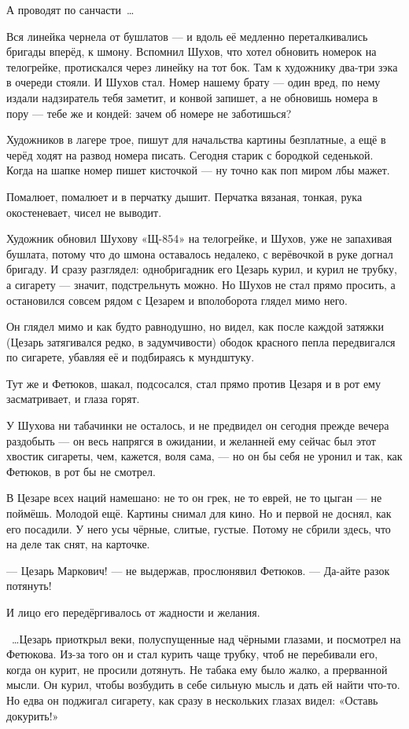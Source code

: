 А проводят по санчасти~\dots{}

Вся линейка чернела от бушлатов --- и вдоль её медленно переталкивались бригады вперёд, к 
шмону. Вспомнил Шухов, что хотел обновить номерок на телогрейке, протискался через линейку 
на тот бок. Там к художнику два-три зэка в очереди стояли. И Шухов стал. Номер нашему брату --- 
один вред, по нему издали надзиратель тебя заметит, и конвой запишет, а не обновишь номера в 
пору --- тебе же и кондей: зачем об номере не заботишься?

Художников в лагере трое, пишут для начальства картины безплатные, а ещё в черёд ходят на 
развод номера писать. Сегодня старик с бородкой седенькой. Когда на шапке номер пишет 
кисточкой --- ну точно как поп миром лбы мажет.

Помалюет, помалюет и в перчатку дышит. Перчатка вязаная, тонкая, рука окостеневает, чисел не 
выводит.

Художник обновил Шухову «Щ-854» на телогрейке, и Шухов, уже не запахивая бушлата, потому что до 
шмона оставалось недалеко, с верёвочкой в руке догнал бригаду. И сразу разглядел: 
однобригадник его Цезарь курил, и курил не трубку, а сигарету --- значит, подстрельнуть можно. 
Но Шухов не стал прямо просить, а остановился совсем рядом с Цезарем и вполоборота глядел 
мимо него.

Он глядел мимо и как будто равнодушно, но видел, как после каждой затяжки (Цезарь затягивался 
редко, в задумчивости) ободок красного пепла передвигался по сигарете, убавляя её и 
подбираясь к мундштуку.

Тут же и Фетюков, шакал, подсосался, стал прямо против Цезаря и в рот ему засматривает, и 
глаза горят.

У Шухова ни табачинки не осталось, и не предвидел он сегодня прежде вечера раздобыть --- он 
весь напрягся в ожидании, и желанней ему сейчас был этот хвостик сигареты, чем, кажется, воля 
сама, --- но он бы себя не уронил и так, как Фетюков, в рот бы не смотрел.

В Цезаре всех наций намешано: не то он грек, не то еврей, не то цыган --- не поймёшь. Молодой ещё. 
Картины снимал для кино. Но и первой не доснял, как его посадили. У него усы чёрные, слитые, 
густые. Потому не сбрили здесь, что на деле так снят, на карточке.

--- Цезарь Маркович! --- не выдержав, прослюнявил Фетюков. --- Да-айте разок потянуть!

И лицо его передёргивалось от жадности и желания.

~\dots{}Цезарь приоткрыл веки, полуспущенные над чёрными глазами, и посмотрел на Фетюкова. Из-за 
того он и стал курить чаще трубку, чтоб не перебивали его, когда он курит, не просили 
дотянуть. Не табака ему было жалко, а прерванной мысли. Он курил, чтобы возбудить в себе 
сильную мысль и дать ей найти что-то. Но едва он поджигал сигарету, как сразу в нескольких 
глазах видел: «Оставь докурить!»

